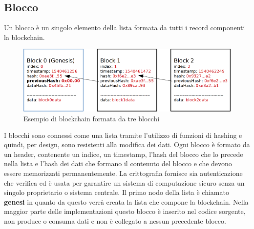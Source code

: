 \subsection{Blocco}
Un blocco è un singolo elemento della lista formata da tutti i record componenti la blockchain.
\begin{figure}[H]
    \centering
    \includegraphics[width=\textwidth]{images/blockchain_basic.png}
    \caption{Esempio di blockchain formata da tre blocchi}
\end{figure}
I blocchi sono connessi come una lista tramite l'utilizzo di funzioni di hashing e quindi, per design, sono resistenti alla modifica dei dati. Ogni blocco è formato da un header, contenente un indice, un timestamp, l'hash del blocco che lo precede nella lista e l'hash dei dati che formano il contenuto del blocco e che devono essere memorizzati permanentemente.\newline
La crittografia fornisce sia autenticazione che verifica ed è usata per garantire un sistema di computazione sicuro senza un singolo proprietario o sistema centrale.\newline
Il primo nodo della lista è chiamato \textbf{genesi} in quanto da questo verrà creata la lista che compone la blockchain. Nella maggior parte delle implementazioni questo blocco è inserito nel codice sorgente, non produce o consuma dati e non è collegato a nessun precedente blocco.
\begin{table}[H]
    \caption{Blocco \textit{genesi} della blockchain per i Bitcoin, il timestamp corrisponde alla data di Sabato 3 Gennaio 2009 alle ore 18:15:05}
    \centering
\end{table}
